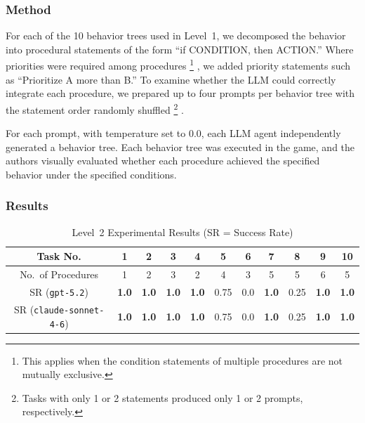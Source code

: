 \documentclass[conference]{IEEEtran}
\begin{document}
\subsubsection{Method}

For each of the 10 behavior trees used in Level~1, we decomposed the behavior into procedural statements of the form ``if CONDITION, then ACTION.'' Where priorities were required among procedures%
\footnote{This applies when the condition statements of multiple procedures are not mutually exclusive.}%
, we added priority statements such as ``Prioritize A more than B.'' To examine whether the LLM could correctly integrate each procedure, we prepared up to four prompts per behavior tree with the statement order randomly shuffled%
\footnote{Tasks with only 1 or 2 statements produced only 1 or 2 prompts, respectively.}%
.

For each prompt, with temperature set to 0.0, each LLM agent independently generated a behavior tree. Each behavior tree was executed in the game, and the authors visually evaluated whether each procedure achieved the specified behavior under the specified conditions.

\subsubsection{Results}

\begin{table}[tbp]
\centering
\caption{Level~2 Experimental Results (SR = Success Rate)}\label{tab:level2}
\begin{tabular}{c|cccccccccc}
\hline
Task No.                     &  1            &  2            &  3            &  4            &  5   &  6  &  7            &  8   &  9            & 10            \\
\hline
No.\ of Procedures           &  1            &  2            &  3            &  2            &  4   &  3  &  5            &  5   &  6            &  5            \\
SR (\texttt{gpt-5.2})        & \textbf{1.0} & \textbf{1.0} & \textbf{1.0} & \textbf{1.0} & 0.75 & 0.0 & \textbf{1.0} & 0.25 & \textbf{1.0} & \textbf{1.0} \\
SR (\texttt{claude-sonnet-4-6}) & \textbf{1.0} & \textbf{1.0} & \textbf{1.0} & \textbf{1.0} & 0.75 & 0.0 & \textbf{1.0} & 0.25 & \textbf{1.0} & \textbf{1.0} \\
\hline
\end{tabular}
\end{table}
\end{document}
